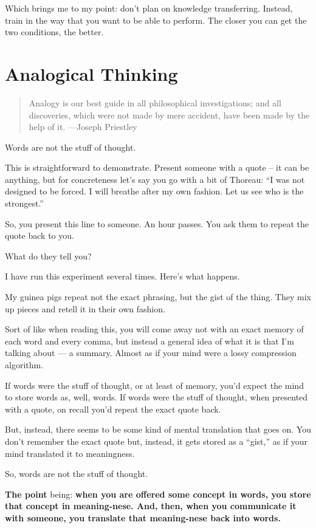Which brings me to my point: don't plan on knowledge transferring. Instead,
train in the way that you want to be able to perform. The closer you can get the
two conditions, the better.

\section{Analogical Thinking}

\begin{quote}
Analogy is our best guide in all philosophical investigations; and all
discoveries, which were not made by mere accident, have been made by the
help of it. \label{quote-attribute}{---Joseph Priestley}
\end{quote}

Words are not the stuff of thought.

This is straightforward to demonstrate. Present someone with a quote --
it can be anything, but for concreteness let's say you go with a bit of
Thoreau: ``I was not designed to be forced. I will breathe after my own
fashion. Let us see who is the strongest.''

So, you present this line to someone. An hour passes. You ask them to repeat the
quote back to you.

What do they tell you?

I have run this experiment several times. Here's what happens.

My guinea pigs repeat not the exact phrasing, but the gist of the
thing. They mix up pieces and retell it in their own fashion.

Sort of like when reading this, you will come away not with an
exact memory of each word and every comma, but instead a general idea of
what it is that I'm talking about --- a summary. Almost as if your mind
were a lossy compression algorithm.

If words were the stuff of thought, or at least of memory, you'd expect
the mind to store words as, well, words. If words were the stuff of
thought, when presented with a quote, on recall you'd repeat the exact
quote back.

But, instead, there seems to be some kind of mental translation that
goes on. You don't remember the exact quote but, instead, it gets stored
as a ``gist,'' as if your mind translated it to meaningness.

So, words are not the stuff of thought.

\textbf{The point} being: \textbf{when you are
offered some concept in words, you store that concept in meaning-nese.
And, then, when you communicate it with someone, you translate that
meaning-nese back into words.}

